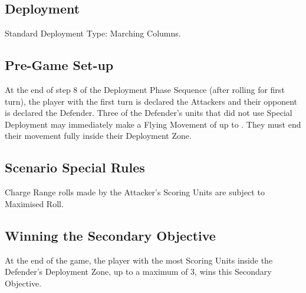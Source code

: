 
\label{HoldTheLine}


\subsection*{Deployment}

Standard Deployment Type: Marching Columns.


\subsection*{Pre-Game Set-up}

At the end of step 8 of the Deployment Phase Sequence (after rolling for first turn), the player with the first turn is declared the Attackers and their opponent is declared the Defender. Three of the Defender's units that did not use Special Deployment may immediately make a Flying Movement of up to . They must end their movement fully inside their Deployment Zone.

\subsection*{Scenario Special Rules}

Charge Range rolls made by the Attacker's Scoring Units are subject to Maximised Roll.

\subsection*{Winning the Secondary Objective}

At the end of the game, the player with the most Scoring Units inside the Defender's Deployment Zone, up to a maximum of 3, wins this Secondary Objective.

